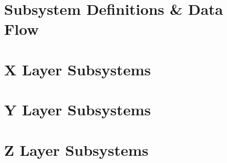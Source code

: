 \documentclass[11pt,letterpaper]{article}
\begin{document}
\section{Subsystem Definitions \& Data Flow}

\newpage
\section{X Layer Subsystems}

\newpage
\section{Y Layer Subsystems}

\newpage
\section{Z Layer Subsystems}

\newpage



{}
\end{document}
